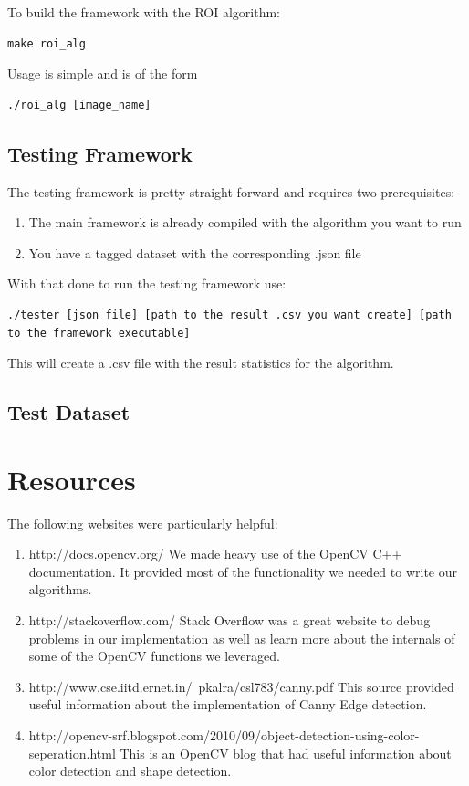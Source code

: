 \documentclass[letterpaper,10pt,titlepage]{article}
\begin{document}
To build the framework with the ROI algorithm:
\begin{lstlisting}
make roi_alg
\end{lstlisting}

Usage is simple and is of the form
\begin{lstlisting}
./roi_alg [image_name]
\end{lstlisting}

\subsection*{Testing Framework}

The testing framework is pretty straight forward and requires two prerequisites:
\begin{enumerate}
    \item The main framework is already compiled with the algorithm you want to run
    \item You have a tagged dataset with the corresponding .json file 
\end{enumerate}
With that done to run the testing framework use:
\begin{lstlisting}
./tester [json file] [path to the result .csv you want create] [path to the framework executable]
\end{lstlisting}
This will create a .csv file with the result statistics for the algorithm.

\subsection*{Test Dataset}

\section*{Resources}
The following websites were particularly helpful:

\begin{enumerate}
    \item http://docs.opencv.org/
    We made heavy use of the OpenCV C++ documentation. It provided most of the
    functionality we needed to write our algorithms.
    \item http://stackoverflow.com/
    Stack Overflow was a great website to debug problems in our implementation
    as well as learn more about the internals of some of the OpenCV functions
    we leveraged.
    \item http://www.cse.iitd.ernet.in/~pkalra/csl783/canny.pdf
    This source provided useful information about the implementation of Canny
    Edge detection.
    \item http://opencv-srf.blogspot.com/2010/09/object-detection-using-color-seperation.html
    This is an OpenCV blog that had useful information about color detection
    and shape detection.
\end{enumerate}
\end{document}
